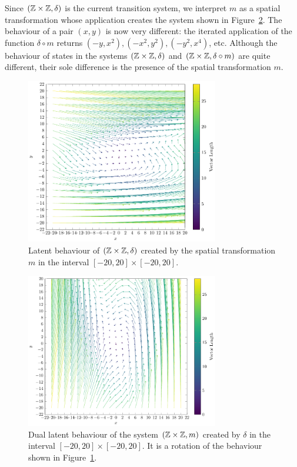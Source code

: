 Since $(\mathbb{Z}\times\mathbb{Z}, \delta)$ is the current transition system, we interpret $m$ as a spatial transformation whose application creates the system shown in Figure~\ref{fig:SecondLatent}. %
The behaviour of a pair $(x,y)$ is now very different: the iterated application of the function $\delta\circ m$ returns $(-y,x^2),(-x^2,y^2),(-y^2,x^4)$, etc. Although the behaviour of states in the systems $(\mathbb{Z}\times\mathbb{Z}, \delta)$ and $(\mathbb{Z}\times\mathbb{Z}, \delta\circ m)$ are quite different, their sole difference is the presence of the spatial transformation $m$. 
\begin{figure}[!t]
  \centering
  \includegraphics[width=0.75\textwidth]{Figures/VectorSpace4.pdf} 
  \caption{Latent behaviour of $(\mathbb{Z}\times\mathbb{Z}, \delta)$ created by the spatial transformation $m$ in the interval $[-20,20]\times[-20,20]$.}
  \label{fig:FirstLatent}
\end{figure} 
\begin{figure}[!t]
  \centering
  \includegraphics[width=0.75\textwidth]{Figures/VectorSpace3.pdf} 
  \caption{Dual latent behaviour of the system $(\mathbb{Z}\times\mathbb{Z}, m)$ created by $\delta$ in the interval $[-20,20]\times[-20,20]$. It is a rotation of the behaviour shown in Figure~\ref{fig:FirstLatent}.}
  \label{fig:SecondLatent} 
\end{figure}

